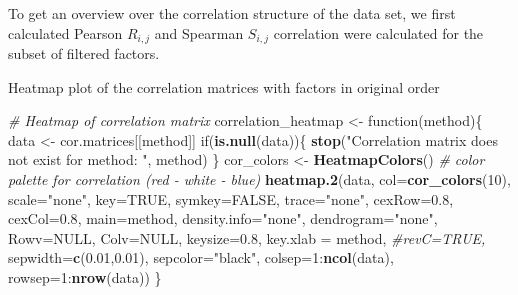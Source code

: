 \documentclass[]{article}
\newenvironment{Shaded}{\begin{snugshade}}{\end{snugshade}}
\newcommand{\KeywordTok}[1]{\textcolor[rgb]{0.13,0.29,0.53}{\textbf{{#1}}}}
\newcommand{\DataTypeTok}[1]{\textcolor[rgb]{0.13,0.29,0.53}{{#1}}}
\newcommand{\DecValTok}[1]{\textcolor[rgb]{0.00,0.00,0.81}{{#1}}}
\newcommand{\FloatTok}[1]{\textcolor[rgb]{0.00,0.00,0.81}{{#1}}}
\newcommand{\StringTok}[1]{\textcolor[rgb]{0.31,0.60,0.02}{{#1}}}
\newcommand{\CommentTok}[1]{\textcolor[rgb]{0.56,0.35,0.01}{\textit{{#1}}}}
\newcommand{\OtherTok}[1]{\textcolor[rgb]{0.56,0.35,0.01}{{#1}}}
\newcommand{\NormalTok}[1]{{#1}}
\begin{document}
To get an overview over the correlation structure of the data set, we
first calculated Pearson \(R_{i,j}\) and Spearman \(S_{i,j}\)
correlation were calculated for the subset of filtered factors.

\begin{Shaded}
\end{Shaded}

Heatmap plot of the correlation matrices with factors in original order

\begin{Shaded}
\begin{Highlighting}[]
\CommentTok{# Heatmap of correlation matrix}
\NormalTok{correlation_heatmap <-}\StringTok{ }\NormalTok{function(method)\{}
  \NormalTok{data <-}\StringTok{ }\NormalTok{cor.matrices[[method]]}
  \NormalTok{if(}\KeywordTok{is.null}\NormalTok{(data))\{}
    \KeywordTok{stop}\NormalTok{(}\StringTok{"Correlation matrix does not exist for method: "}\NormalTok{, method)}
  \NormalTok{\}}
  \NormalTok{cor_colors <-}\StringTok{ }\KeywordTok{HeatmapColors}\NormalTok{() }\CommentTok{# color palette for correlation (red - white - blue)}
  \KeywordTok{heatmap.2}\NormalTok{(data, }\DataTypeTok{col=}\KeywordTok{cor_colors}\NormalTok{(}\DecValTok{10}\NormalTok{), }\DataTypeTok{scale=}\StringTok{"none"}\NormalTok{,}
          \DataTypeTok{key=}\OtherTok{TRUE}\NormalTok{, }\DataTypeTok{symkey=}\OtherTok{FALSE}\NormalTok{, }\DataTypeTok{trace=}\StringTok{"none"}\NormalTok{, }\DataTypeTok{cexRow=}\FloatTok{0.8}\NormalTok{, }\DataTypeTok{cexCol=}\FloatTok{0.8}\NormalTok{,}
          \DataTypeTok{main=}\NormalTok{method,}
          \DataTypeTok{density.info=}\StringTok{"none"}\NormalTok{, }\DataTypeTok{dendrogram=}\StringTok{"none"}\NormalTok{, }
          \DataTypeTok{Rowv=}\OtherTok{NULL}\NormalTok{, }\DataTypeTok{Colv=}\OtherTok{NULL}\NormalTok{, }
          \DataTypeTok{keysize=}\FloatTok{0.8}\NormalTok{, }\DataTypeTok{key.xlab =} \NormalTok{method,}
          \CommentTok{#revC=TRUE,}
          \DataTypeTok{sepwidth=}\KeywordTok{c}\NormalTok{(}\FloatTok{0.01}\NormalTok{,}\FloatTok{0.01}\NormalTok{),}
          \DataTypeTok{sepcolor=}\StringTok{"black"}\NormalTok{,}
          \DataTypeTok{colsep=}\DecValTok{1}\NormalTok{:}\KeywordTok{ncol}\NormalTok{(data),}
          \DataTypeTok{rowsep=}\DecValTok{1}\NormalTok{:}\KeywordTok{nrow}\NormalTok{(data))}
\NormalTok{\}}
\end{Highlighting}
\end{Shaded}
\end{document}
